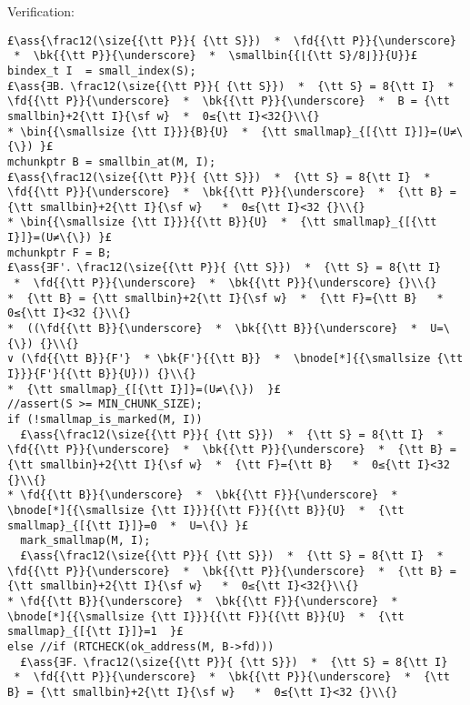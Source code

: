 \documentclass[10pt,a4paper,twoside]{report}
\makeatletter
\newcommand{\ml}[2][t]{\mbox{\mdseries\begin{tabular}[#1]{@{}L@{}}#2\end{tabular}}}
\newcommand{\ass}[1]{\ensuremath{{\color{blue}\left\{\ml[c]{#1}\right\}}}}
\makeatother
\begin{document}
\noindent Verification:
\begin{lstlisting}
£\ass{\frac12(\size{{\tt P}}{ {\tt S}})  *  \fd{{\tt P}}{\underscore}  *  \bk{{\tt P}}{\underscore}  *  \smallbin{{⌊{\tt S}/8⌋}}{U}}£
bindex_t I  = small_index(S);
£\ass{∃B．\frac12(\size{{\tt P}}{ {\tt S}})  *  {\tt S} = 8{\tt I}  *  \fd{{\tt P}}{\underscore}  *  \bk{{\tt P}}{\underscore}  *  B = {\tt smallbin}+2{\tt I}{\sf w}  *  0≤{\tt I}<32{}\\{}
* \bin{{\smallsize {\tt I}}}{B}{U}  *  {\tt smallmap}_{[{\tt I}]}=(U≠\{\}) }£
mchunkptr B = smallbin_at(M, I);
£\ass{\frac12(\size{{\tt P}}{ {\tt S}})  *  {\tt S} = 8{\tt I}  *  \fd{{\tt P}}{\underscore}  *  \bk{{\tt P}}{\underscore}  *  {\tt B} = {\tt smallbin}+2{\tt I}{\sf w}   *  0≤{\tt I}<32 {}\\{}
* \bin{{\smallsize {\tt I}}}{{\tt B}}{U}  *  {\tt smallmap}_{[{\tt I}]}=(U≠\{\}) }£
mchunkptr F = B;
£\ass{∃F'．\frac12(\size{{\tt P}}{ {\tt S}})  *  {\tt S} = 8{\tt I}  *  \fd{{\tt P}}{\underscore}  *  \bk{{\tt P}}{\underscore} {}\\{}
*  {\tt B} = {\tt smallbin}+2{\tt I}{\sf w}  *  {\tt F}={\tt B}   *  0≤{\tt I}<32 {}\\{}
*  ((\fd{{\tt B}}{\underscore}  *  \bk{{\tt B}}{\underscore}  *  U=\{\}) {}\\{}
∨ (\fd{{\tt B}}{F'}  * \bk{F'}{{\tt B}}  *  \bnode[*]{{\smallsize {\tt I}}}{F'}{{\tt B}}{U})) {}\\{}
*  {\tt smallmap}_{[{\tt I}]}=(U≠\{\})  }£
//assert(S >= MIN_CHUNK_SIZE);
if (!smallmap_is_marked(M, I))
  £\ass{\frac12(\size{{\tt P}}{ {\tt S}})  *  {\tt S} = 8{\tt I}  *  \fd{{\tt P}}{\underscore}  *  \bk{{\tt P}}{\underscore}  *  {\tt B} = {\tt smallbin}+2{\tt I}{\sf w}  *  {\tt F}={\tt B}   *  0≤{\tt I}<32 {}\\{}
* \fd{{\tt B}}{\underscore}  *  \bk{{\tt F}}{\underscore}  *  \bnode[*]{{\smallsize {\tt I}}}{{\tt F}}{{\tt B}}{U}  *  {\tt smallmap}_{[{\tt I}]}=0  *  U=\{\} }£
  mark_smallmap(M, I);
  £\ass{\frac12(\size{{\tt P}}{ {\tt S}})  *  {\tt S} = 8{\tt I}  *  \fd{{\tt P}}{\underscore}  *  \bk{{\tt P}}{\underscore}  *  {\tt B} = {\tt smallbin}+2{\tt I}{\sf w}   *  0≤{\tt I}<32{}\\{}
* \fd{{\tt B}}{\underscore}  *  \bk{{\tt F}}{\underscore}  *  \bnode[*]{{\smallsize {\tt I}}}{{\tt F}}{{\tt B}}{U}  *  {\tt smallmap}_{[{\tt I}]}=1  }£
else //if (RTCHECK(ok_address(M, B->fd)))
  £\ass{∃F．\frac12(\size{{\tt P}}{ {\tt S}})  *  {\tt S} = 8{\tt I}  *  \fd{{\tt P}}{\underscore}  *  \bk{{\tt P}}{\underscore}  *  {\tt B} = {\tt smallbin}+2{\tt I}{\sf w}   *  0≤{\tt I}<32 {}\\{}

\end{lstlisting}
\end{document}
